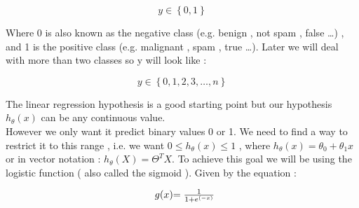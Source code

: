 \[ y \in \left\{ 0,1 \right\} \]

Where 0 is also known as the negative class (e.g. benign , not spam , false
\ldots) , and 1 is the positive class (e.g. malignant , spam , true \ldots).
Later we will deal with more than two classes so y will look like :

\[ y \in \left\{ 0,1,2,3, \ldots , n \right\} \]

The linear regression hypothesis is a good starting point but our hypothesis
\( h_{\theta} (x) \) can be any continuous value. \\

However we only want it predict binary values 0 or 1. We need to find a way to
restrict it to this range , i.e.  we want \( 0 \leq h_{\theta} (x) \leq 1 \) ,
where \( h_\theta (x) = \theta_0 + \theta_1 x \) or in vector notation : \(
	h_{\theta}(X) = \Theta^T X \). To achieve this goal we will be using the
logistic function ( also called the sigmoid ). Given by the equation : 

\[
	\begin{array}{ l@{} l@{} }
		g(x)
		& =
		\frac{1}
		{
			1+e^
			{
				\left( - x \right)
			}
		}
	\end{array}
\]



